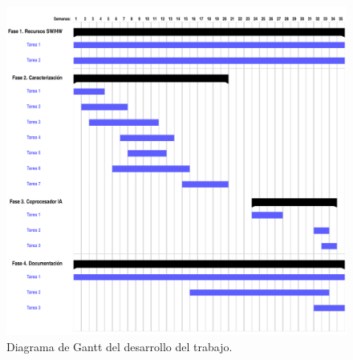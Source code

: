 \begin{figure}[H]
    \vspace*{45mm}
    \centering
    \includegraphics[width=14cm]{Figuras/Gantt.pdf}
    \caption{Diagrama de Gantt del desarrollo del trabajo.}
    \label{fig:gantt}
\end{figure}


%



